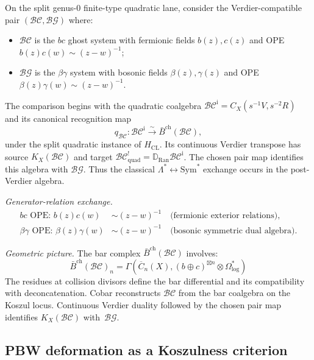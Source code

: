 \begin{example}
\label{ex:bc-betagamma-koszul}
On the split genus-$0$ finite-type quadratic lane, consider the
Verdier-compatible pair $(\mathcal{BC}, \mathcal{BG})$ where:
\begin{itemize}
\item $\mathcal{BC}$ is the $bc$ ghost system with fermionic fields
 $b(z), c(z)$ and OPE $b(z)c(w) \sim (z-w)^{-1}$;
\item $\mathcal{BG}$ is the $\beta\gamma$ system with bosonic fields
 $\beta(z), \gamma(z)$ and OPE
 $\beta(z)\gamma(w) \sim (z-w)^{-1}$.
\end{itemize}

The comparison begins with the quadratic coalgebra
$\mathcal{BC}^{\mathrm i}=C_X(s^{-1}V,s^{-2}R)$ and its canonical
recognition map
\[
q_{\mathcal{BC}}\colon
\mathcal{BC}^{\mathrm i}
\xrightarrow{\;\sim\;}
\bar{B}^{\mathrm{ch}}(\mathcal{BC}),
\]
under the split quadratic instance of $H_{\mathrm{CL}}$.  Its
continuous Verdier transpose has source
$K_X(\mathcal{BC})$ and target
$\mathcal{BC}^!_{\mathrm{quad}}
=\mathbb D_{\operatorname{Ran}}\mathcal{BC}^{\mathrm i}$.
The chosen pair map identifies this algebra with
$\mathcal{BG}$. Thus the classical
$\Lambda^* \leftrightarrow \mathrm{Sym}^*$ exchange occurs in the
post-Verdier algebra.

\emph{Generator-relation exchange.}
\begin{align*}
\text{$bc$ OPE: } b(z)c(w) &\sim (z-w)^{-1}
 \quad \text{(fermionic exterior relations)}, \\
\text{$\beta\gamma$ OPE: } \beta(z)\gamma(w) &\sim (z-w)^{-1}
 \quad \text{(bosonic symmetric dual algebra)}.
\end{align*}

\emph{Geometric picture.}
The bar complex $\bar{B}^{\text{ch}}(\mathcal{BC})$ involves:
\[\bar{B}^{\text{ch}}(\mathcal{BC})_n = \Gamma\left(\overline{C}_n(X), (b \oplus c)^{\boxtimes n} \otimes \Omega^*_{\log}\right)\]
The residues at collision divisors define the bar differential and
its compatibility with deconcatenation. Cobar reconstructs
$\mathcal{BC}$ from the bar coalgebra on the Koszul locus.  Continuous
Verdier duality followed by the chosen pair map identifies
$K_X(\mathcal{BC})$ with~$\mathcal{BG}$.
\end{example}

\subsection{PBW deformation as a Koszulness criterion}
\label{sec:koszulness-verification}

